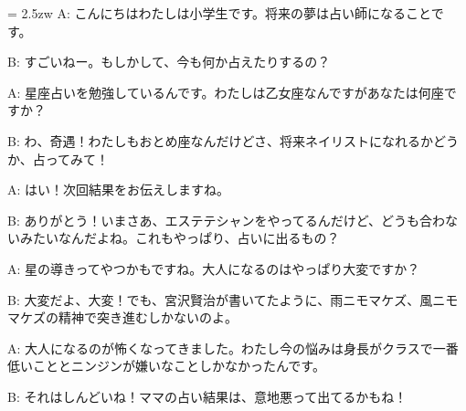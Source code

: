 \documentclass[11pt]{amsart}
\title{}
\author{}
\newenvironment{hangall}[1]{\hangindent = 2.5zw\everypar{\hangindent = 2.5zw}}{}
\begin{document}
\maketitle
\begin{hangall}{}%
A: こんにちはわたしは小学生です。将来の夢は占い師になることです。



B: すごいねー。もしかして、今も何か占えたりするの？



A: 星座占いを勉強しているんです。わたしは乙女座なんですがあなたは何座ですか？



B: わ、奇遇！わたしもおとめ座なんだけどさ、将来ネイリストになれるかどうか、占ってみて！



A: はい！次回結果をお伝えしますね。



B: ありがとう！いまさあ、エステテシャンをやってるんだけど、どうも合わないみたいなんだよね。これもやっぱり、占いに出るもの？



A: 星の導きってやつかもですね。大人になるのはやっぱり大変ですか？



B: 大変だよ、大変！でも、宮沢賢治が書いてたように、雨ニモマケズ、風ニモマケズの精神で突き進むしかないのよ。



A: 大人になるのが怖くなってきました。わたし今の悩みは身長がクラスで一番低いこととニンジンが嫌いなことしかなかったんです。



B: それはしんどいね！ママの占い結果は、意地悪って出てるかもね！\end{hangall}
\end{document}
